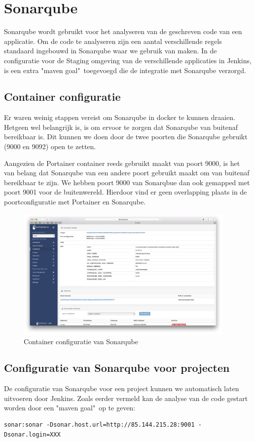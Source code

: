 \chapter{Sonarqube}
Sonarqube wordt gebruikt voor het analyseren van de geschreven code van een applicatie. Om de code te analyseren zijn een aantal verschillende regels standaard ingebouwd in Sonarqube waar we gebruik van maken.
In de configuratie voor de Staging omgeving van de verschillende applicaties in Jenkins, is een extra "maven goal"\ toegevoegd die de integratie met Sonarqube verzorgd.

\section{Container configuratie}
Er waren weinig stappen vereist om Sonarqube in docker te kunnen draaien. Hetgeen wel belangrijk is, is om ervoor te zorgen dat Sonarqube van buitenaf bereikbaar is. Dit kunnen we doen door de twee poorten die Sonarqube gebruikt (9000 en 9092) open te zetten.

Aangezien de Portainer container reeds gebruikt maakt van poort 9000, is het van belang dat Sonarqube van een andere poort gebruikt maakt om van buitenaf bereikbaar te zijn. We hebben poort 9000 van Sonarqbue dan ook gemapped met poort 9001 voor de buitenwereld. Hierdoor vind er geen overlapping plaats in de poortconfiguratie met Portainer en Sonarqube.

\begin{figure}[H]
	\centering
	\includegraphics[width=0.95\textwidth]{img/SonarqubeContainerDetails.png}
	\caption{Container configuratie van Sonarqube}
	\label{fig:SonarqubeContainerDetails}
\end{figure}

\newpage
\section{Configuratie van Sonarqube voor projecten}
De configuratie van Sonarqube voor een project kunnen we automatisch laten uitvoeren door Jenkins. Zoals eerder vermeld kan de analyse van de code gestart worden door een "maven goal"\ op te geven: 
\begin{lstlisting}
sonar:sonar -Dsonar.host.url=http://85.144.215.28:9001 -Dsonar.login=XXX
\end{lstlisting}

